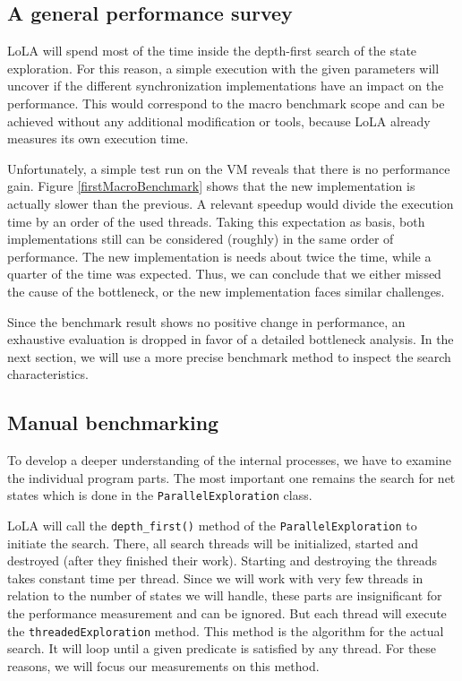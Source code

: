 \subsection{A general performance survey}
LoLA will spend most of the time inside the depth-first search of the state exploration. For this reason, a simple execution with the given parameters will uncover if the different synchronization implementations have an impact on the performance. This would correspond to the macro benchmark scope and can be achieved without any additional modification or tools, because LoLA already measures its own execution time.

Unfortunately, a simple test run on the VM reveals that there is no performance gain. Figure \ref{firstMacroBenchmark} shows that the new implementation is actually slower than the previous. A relevant speedup would divide the execution time by an order of the used threads. Taking this expectation as basis, both implementations still can be considered (roughly) in the same order of performance. The new implementation is needs about twice the time, while a quarter of the time was expected. Thus, we can conclude that we either missed the cause of the bottleneck, or the new implementation faces similar challenges.



Since the benchmark result shows no positive change in performance, an exhaustive evaluation is dropped in favor of a detailed bottleneck analysis. In the next section, we will use a more precise benchmark method to inspect the search characteristics.

\subsection{Manual benchmarking}
To develop a deeper understanding of the internal processes, we have to examine the individual program parts. The most important one remains the search for net states which is done in the \texttt{ParallelExploration} class.

LoLA will call the \texttt{depth\_first()} method of the \texttt{ParallelExploration} to initiate the search. There, all search threads will be initialized, started and destroyed (after they finished their work). Starting and destroying the threads takes constant time per thread. Since we will work with very few threads in relation to the number of states we will handle, these parts are insignificant for the performance measurement and can be ignored. But each thread will execute the \texttt{threadedExploration} method. This method is the algorithm for the actual search. It will loop until a given predicate is satisfied by any thread. For these reasons, we will focus our measurements on this method.

